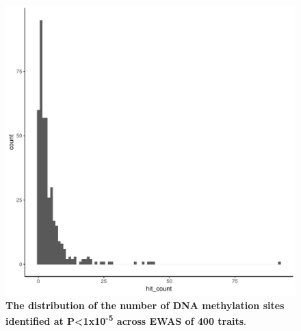 \documentclass[11pt,oneside]{bristolthesis}
\begin{document}
\begin{figure}

{\centering \includegraphics[width=1\linewidth]{figure/05-h2ewas/FOM_hit_count_distribution} 

}

\caption[The distribution of the number of DNA methylation sites identified at P\textless1x10\textsuperscript{-5} across EWAS of 400 traits]{\textbf{The distribution of the number of DNA methylation sites identified at P\textless1x10\textsuperscript{-5} across EWAS of 400 traits}.}\label{fig:h2ewas-dmp-dist}
\end{figure}
\end{document}
